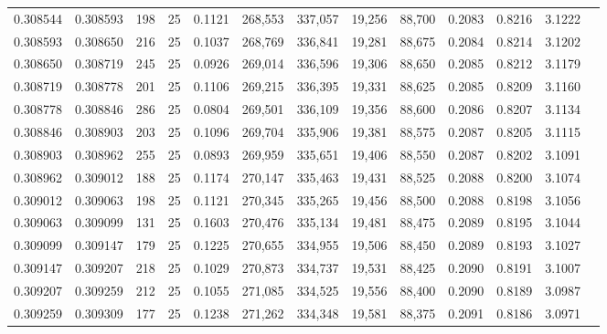 \begin{tabular}{rrrrrrrrrrrrr}
0.308544 & 0.308593 &   198 &  25 &                                     0.1121 & 268,553 & 337,057 &  19,256 &  88,700 & 0.2083 & 0.8216 & 3.1222 \\
0.308593 & 0.308650 &   216 &  25 &                                     0.1037 & 268,769 & 336,841 &  19,281 &  88,675 & 0.2084 & 0.8214 & 3.1202 \\
0.308650 & 0.308719 &   245 &  25 &                                     0.0926 & 269,014 & 336,596 &  19,306 &  88,650 & 0.2085 & 0.8212 & 3.1179 \\
0.308719 & 0.308778 &   201 &  25 &                                     0.1106 & 269,215 & 336,395 &  19,331 &  88,625 & 0.2085 & 0.8209 & 3.1160 \\
0.308778 & 0.308846 &   286 &  25 &                                     0.0804 & 269,501 & 336,109 &  19,356 &  88,600 & 0.2086 & 0.8207 & 3.1134 \\
0.308846 & 0.308903 &   203 &  25 &                                     0.1096 & 269,704 & 335,906 &  19,381 &  88,575 & 0.2087 & 0.8205 & 3.1115 \\
0.308903 & 0.308962 &   255 &  25 &                                     0.0893 & 269,959 & 335,651 &  19,406 &  88,550 & 0.2087 & 0.8202 & 3.1091 \\
0.308962 & 0.309012 &   188 &  25 &                                     0.1174 & 270,147 & 335,463 &  19,431 &  88,525 & 0.2088 & 0.8200 & 3.1074 \\
0.309012 & 0.309063 &   198 &  25 &                                     0.1121 & 270,345 & 335,265 &  19,456 &  88,500 & 0.2088 & 0.8198 & 3.1056 \\
0.309063 & 0.309099 &   131 &  25 &                                     0.1603 & 270,476 & 335,134 &  19,481 &  88,475 & 0.2089 & 0.8195 & 3.1044 \\
0.309099 & 0.309147 &   179 &  25 &                                     0.1225 & 270,655 & 334,955 &  19,506 &  88,450 & 0.2089 & 0.8193 & 3.1027 \\
0.309147 & 0.309207 &   218 &  25 &                                     0.1029 & 270,873 & 334,737 &  19,531 &  88,425 & 0.2090 & 0.8191 & 3.1007 \\
0.309207 & 0.309259 &   212 &  25 &                                     0.1055 & 271,085 & 334,525 &  19,556 &  88,400 & 0.2090 & 0.8189 & 3.0987 \\
0.309259 & 0.309309 &   177 &  25 &                                     0.1238 & 271,262 & 334,348 &  19,581 &  88,375 & 0.2091 & 0.8186 & 3.0971 \\

\end{tabular}
